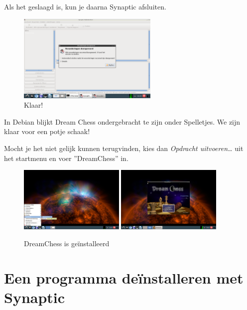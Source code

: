 \documentclass[12pt,a4paper]{article}
\begin{document}
\clearpage

Als het geslaagd is, kun je daarna Synaptic afsluiten.

\begin{figure} [H]
\centering
\includegraphics[width=0.6\textwidth]{plaatje13}
\caption{Klaar!}
\label{plaatje13}
\end{figure}

In Debian blijkt Dream Chess ondergebracht te zijn onder Spelletjes. We zijn klaar voor een potje schaak!

Mocht je het niet gelijk kunnen terugvinden, kies dan \emph{Opdracht uitvoeren\ldots} uit het startmenu en voer ''DreamChess'' in.

\begin{figure} [H]
\centering
\includegraphics[width=0.45\textwidth]{plaatje14}
\includegraphics[width=0.45\textwidth]{plaatje15}
\caption{DreamChess is ge\"{i}nstalleerd}
\label{plaatje14}
\end{figure}

\clearpage

\section{Een programma de\"{i}nstalleren met Synaptic}
\end{document}
